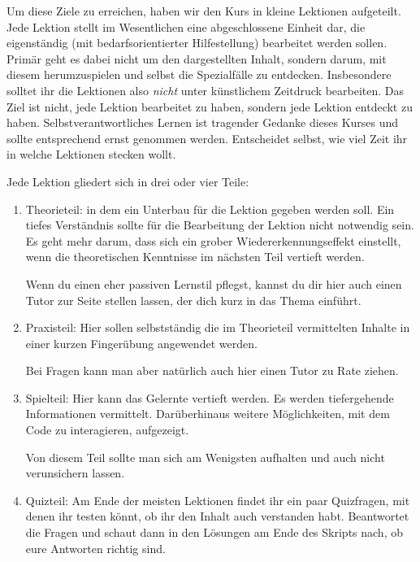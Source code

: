 \documentclass{vorkurs}
\begin{document}
Um diese Ziele zu erreichen, haben wir den Kurs in kleine
Lektionen aufgeteilt. Jede Lektion stellt im Wesentlichen eine abgeschlossene Einheit dar,
die eigenständig (mit bedarfsorientierter Hilfestellung) bearbeitet werden
sollen. Primär geht es dabei nicht um den dargestellten Inhalt, sondern darum,
mit diesem herumzuspielen und selbst die Spezialfälle zu entdecken.
Insbesondere solltet ihr die Lektionen also \emph{nicht} unter künstlichem
Zeitdruck bearbeiten. Das Ziel ist nicht, jede Lektion bearbeitet zu haben,
sondern jede Lektion entdeckt zu haben.  Selbstverantwortliches Lernen ist
tragender Gedanke dieses Kurses und sollte entsprechend ernst genommen werden.
Entscheidet selbst, wie viel Zeit ihr in welche Lektionen stecken wollt.

Jede Lektion gliedert sich in drei oder vier Teile:
\begin{enumerate}
    \item Theorieteil: in dem ein Unterbau für die Lektion gegeben werden
          soll.  Ein tiefes Verständnis sollte für die Bearbeitung der Lektion
          nicht notwendig sein. Es geht mehr darum, dass sich ein grober
          Wiedererkennungseffekt einstellt, wenn die theoretischen Kenntnisse im
          nächsten Teil vertieft werden.

          Wenn du einen eher passiven Lernstil pflegst, kannst du dir hier auch
          einen Tutor zur Seite stellen lassen, der dich kurz in das Thema
          einführt.

    \item Praxisteil: 
          Hier sollen selbstständig die im Theorieteil vermittelten Inhalte 
          in einer kurzen Fingerübung angewendet werden.

          Bei Fragen kann man aber natürlich auch hier einen Tutor zu Rate
          ziehen.

    \item Spielteil: Hier kann das Gelernte vertieft werden.
          Es werden tiefergehende Informationen vermittelt. Darüberhinaus weitere Möglichkeiten, mit
          dem Code zu interagieren, aufgezeigt.

          Von diesem Teil sollte man sich am Wenigsten aufhalten und auch nicht verunsichern lassen.
    
    \item Quizteil: Am Ende der meisten Lektionen findet ihr ein paar Quizfragen, mit denen ihr testen könnt, 
    ob ihr den Inhalt auch verstanden habt. Beantwortet die Fragen und schaut dann in den Lösungen am Ende des 
    Skripts nach, ob eure Antworten richtig sind. 

\end{enumerate}
\end{document}
